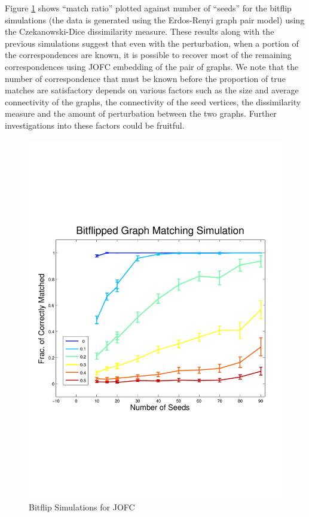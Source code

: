 \documentclass[12pt,oneside,final]{thesis}\usepackage[]{graphicx}\usepackage[]{color}
\begin{document}
Figure \ref{fig:bitflipJOFC} shows ``match ratio'' plotted against number of ``seeds'' for the bitflip simulations (the data is generated using the Erdos-Renyi graph pair model) using the Czekanowski-Dice dissimilarity measure. These results along with the previous simulations suggest that even with the perturbation, when a portion of the correspondences are known, it is possible to recover most of the remaining correspondences using JOFC embedding of the pair of graphs. We note that the number of correspondence that must be known before the proportion of true matches are satisfactory depends on various factors such as the size and average connectivity of the graphs, the connectivity of the seed vertices, the dissimilarity measure and the amount of perturbation between the two graphs. Further investigations into these factors could be fruitful. 
\begin{figure}
\includegraphics[scale=0.75]{bitflip_JOFC}
\caption{Bitflip Simulations for JOFC \label{fig:bitflipJOFC}}
\end{figure}
\end{document}
